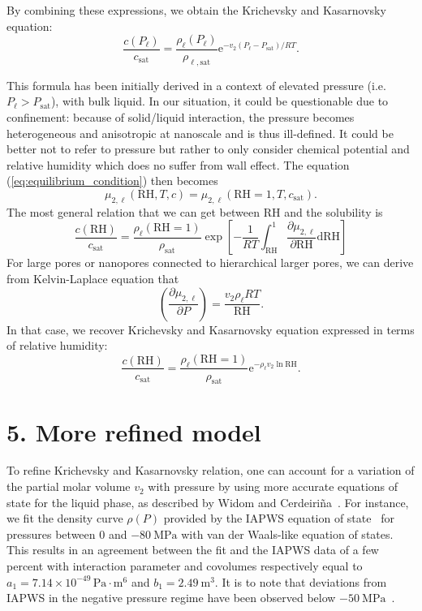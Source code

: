 \documentclass[aps,prl,twocolumn,superscriptaddress,groupedaddress]{revtex4}
\begin{document}
By combining these expressions, we obtain the Krichevsky and Kasarnovsky equation:
\begin{equation}
\frac{c(P_\ell)}{c_\text{sat}} = \frac{\rho_\ell(P_\ell)}{\rho_{\ell,\text{sat}}} \mathrm{e}^{-v_2 (P_\ell - P_\text{sat}) / RT}.
\end{equation}

This formula has been initially derived in a context of elevated pressure (i.e. $P_\ell > P_\text{sat}$), with bulk liquid. In our situation, it could be questionable due to confinement: because of solid/liquid interaction, the pressure becomes heterogeneous and anisotropic at nanoscale and is thus ill-defined. It could be better not to refer to pressure but rather to only consider chemical potential and relative humidity which does no suffer from wall effect. The equation (\ref{eq:equilibrium_condition}) then becomes
\begin{equation}
\mu_{2,\ell} (\mathrm{RH},T,c) = \mu_{2,\ell} (\mathrm{RH}=1,T,c_\text{sat}).
\end{equation}
\noindent The most general relation that we can get between $\mathrm{RH}$ and the solubility is
\begin{equation}
\frac{c(\mathrm{RH})}{c_\text{sat}} = \frac{\rho_\ell(\mathrm{RH}=1)}{\rho_\text{sat}} \exp{\left[-\frac{1}{RT} \int_\mathrm{RH}^1 \frac{\partial \mu_{2,\ell}}{\partial \mathrm{RH}} \mathrm{d}\mathrm{RH} \right]}
\end{equation}
\noindent For large pores or nanopores connected to hierarchical larger pores, we can derive from Kelvin-Laplace equation that
\begin{equation}
\left(\frac{\partial \mu_{2,\ell}}{\partial P}\right) = \frac{v_2 \rho_\ell RT}{\mathrm{RH}}.
\end{equation}
\noindent In that case, we recover Krichevsky and Kasarnovsky equation expressed in terms of relative humidity:
\begin{equation}
\frac{c(\mathrm{RH})}{c_\text{sat}} = \frac{\rho_\ell(\mathrm{RH}=1)}{\rho_\text{sat}} \mathrm{e}^{-\rho_\ell v_2 \ln{\mathrm{RH}}}.
\end{equation}


\section*{5. More refined model}

To refine Krichevsky and Kasarnovsky relation, one can account for a variation of the partial molar volume $v_2$ with pressure by using more accurate equations of state for the liquid phase, as described by Widom and Cerdeiri{\~n}a~\cite{widom_2012,cerdeirina_2016}. For instance, we fit the density curve $\rho(P)$ provided by the IAPWS equation of state~\cite{wagner_2002,davitt_2010} for pressures between $0$ and $-\SI{80}{\mega\pascal}$ with van der Waals-like equation of states. This results in an agreement between the fit and the IAPWS data of a few percent with interaction parameter and covolumes respectively equal to $a_1=7.14 \times 10^{-49} \, \mathrm{Pa \cdot m^6}$ and $b_1=\SI{2.49}{\meter\cubed}$. It is to note that deviations from IAPWS in the negative pressure regime have been observed below $-\SI{50}{\mega\pascal}$~\cite{pallares_2016}.
\end{document}
